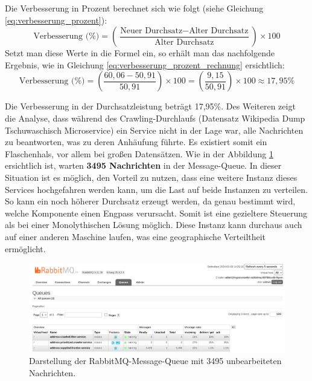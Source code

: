 Die Verbesserung in Prozent berechnet sich wie folgt (siehe Gleichung \ref{eq:verbesserung_prozent}):
\begin{equation}
\text{Verbesserung (\%)} = \left( \frac{\text{Neuer Durchsatz} - \text{Alter Durchsatz}}{\text{Alter Durchsatz}} \right) \times 100
\label{eq:verbesserung_prozent}
\end{equation}
\newpage
Setzt man diese Werte in die Formel ein, so erhält man das nachfolgende Ergebnis, wie in Gleichung \ref{eq:verbesserung_prozent_rechnung} ersichtlich:
\begin{equation}
\text{Verbesserung (\%)} = \left( \frac{60,06 - 50,91}{50,91} \right) \times 100 = \left( \frac{9,15}{50,91} \right) \times 100 \approx 17,95\%
\label{eq:verbesserung_prozent_rechnung}
\end{equation}

Die Verbesserung in der Durchsatzleistung beträgt 17,95\%.
Des Weiteren zeigt die Analyse, dass während des Crawling-Durchlaufs (Datensatz Wikipedia Dump Tschuwaschisch Microservice) ein Service nicht in der Lage war, alle Nachrichten zu beantworten, was zu deren Anhäufung führte. Es existiert somit ein Flaschenhals, vor allem bei großen Datensätzen. Wie in der Abbildung \ref{fig:rabbitmq} ersichtlich ist, warten \textbf{3495 Nachrichten} in der Message-Queue. In dieser Situation ist es möglich, den Vorteil zu nutzen, dass eine weitere Instanz dieses Services hochgefahren werden kann, um die Last auf beide Instanzen zu verteilen. So kann ein noch höherer Durchsatz erzeugt werden, da genau bestimmt wird, welche Komponente einen Engpass verursacht. Somit ist eine gezieltere Steuerung als bei einer Monolythischen Lösung möglich. Diese Instanz kann durchaus auch auf einer anderen Maschine laufen, was eine geographische Verteiltheit ermöglicht.
\begin{figure}[H]
    \centering
    \includegraphics[width=14cm]{images/80_eval/Screenshot from 2024-03-03 14-25-29.png}
    \caption[]{Darstellung der RabbitMQ-Message-Queue mit 3495 unbearbeiteten Nachrichten.}
    \label{fig:rabbitmq}
\end{figure}
\newpage
